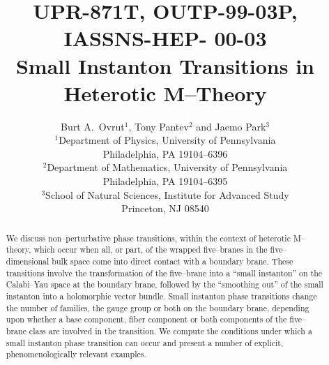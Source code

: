 \documentclass[a4paper,12pt]{article}
\numberwithin{equation}{section}
\newcommand{\ns}{\normalsize}
\theoremstyle{plain}
\begin{document}

\begin{titlepage}

\vspace{-5cm}

\title{
   \hfill{\ns UPR-871T, OUTP-99-03P, IASSNS-HEP- 00-03} \\[1em]
   {\LARGE Small Instanton Transitions  
     in Heterotic M--Theory} \\[1em] } 
\author{
   Burt A.~Ovrut$^1$, Tony Pantev$^2$
   and Jaemo Park$^3$\\[0.5em]
   {\ns $^1$Department of Physics, University of Pennsylvania} \\[-0.4em]
   {\ns Philadelphia, PA 19104--6396}\\
   {\ns $^2$Department of Mathematics, University of Pennsylvania} 
   \\[-0.4em]
   {\ns Philadelphia, PA 19104--6395}\\ 
   {\ns $^3$School of Natural Sciences, 
    Institute for Advanced Study} \\[-0.4em]
   {\ns Princeton, NJ 08540}\\}
\date{}

\maketitle

\begin{abstract}

We discuss non--perturbative phase transitions, within the context of heterotic
M--theory, which occur when all, or part, of the wrapped five--branes in the
five--dimensional bulk space come into direct contact with a
boundary brane. These transitions involve the transformation of the
five--brane into a ``small instanton'' on the Calabi--Yau space at the
boundary brane, followed by the ``smoothing out'' of the small instanton into
a holomorphic vector bundle. Small instanton phase transitions change the
number of families, the gauge group or both on the boundary brane,
depending upon whether a base component, fiber component or both components
of the five--brane class are involved in the transition. We compute the
conditions under which a small instanton phase transition can occur and 
present a number of explicit, phenomenologically relevant examples.
 
\end{abstract}

\thispagestyle{empty}

\end{titlepage}
\end{document}
